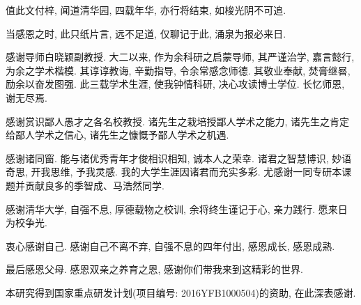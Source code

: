 \begin{acknowledgement}
值此文付梓, 闻道清华园, 四载年华, 亦行将结束, 如梭光阴不可追.

当感恩之时, 此只纸片言, 远不足道, 仅聊记于此, 涌泉为报必来日.

感谢导师白晓颖副教授. 大二以来, 作为余科研之启蒙导师, 其严谨治学, 嘉言懿行, 为余之学术楷模. 其谆谆教诲, 辛勤指导, 令余常感念师德. 其敬业奉献, 焚膏继晷, 励余以奋发图强. 此三载学术生涯, 使我钟情科研, 决心攻读博士学位. 长忆师恩, 谢无尽焉.

感谢赏识鄙人愚才之各名校教授. 诸先生之栽培授鄙人学术之能力, 诸先生之肯定给鄙人学术之信心, 诸先生之慷慨予鄙人学术之机遇.

感谢诸同窗. 能与诸优秀青年才俊相识相知, 诚本人之荣幸. 诸君之智慧博识, 妙语奇思, 开我思维, 予我灵感. 我的大学生涯因诸君而充实多彩. 尤感谢一同专研本课题并贡献良多的季智成、马浩然同学.

感谢清华大学, 自强不息, 厚德载物之校训, 余将终生谨记于心, 亲力践行. 愿来日为校争光.

衷心感谢自己. 感谢自己不离不弃, 自强不息的四年付出, 感恩成长, 感恩成熟.

最后感恩父母. 感恩双亲之养育之恩, 感谢你们带我来到这精彩的世界.

本研究得到国家重点研发计划(项目编号: 2016YFB1000504)的资助, 在此深表感谢.


\end{acknowledgement}
